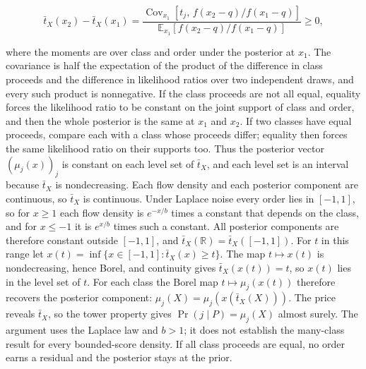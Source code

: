 \documentclass[
  11pt,
]{article}
\begin{document}
\[
\bar t_X(x_2)-\bar t_X(x_1)
=\frac{\operatorname{Cov}_{x_1}\!\left[t_j,\,f(x_2-q)/f(x_1-q)\right]}
{\mathbb E_{x_1}\!\left[f(x_2-q)/f(x_1-q)\right]}\ge0,
\]

where the moments are over class and order under the posterior at
\(x_1\). The covariance is half the expectation of the product of the
difference in class proceeds and the difference in likelihood ratios
over two independent draws, and every such product is nonnegative. If
the class proceeds are not all equal, equality forces the likelihood
ratio to be constant on the joint support of class and order, and then
the whole posterior is the same at \(x_1\) and \(x_2\). If two classes
have equal proceeds, compare each with a class whose proceeds differ;
equality then forces the same likelihood ratio on their supports too.
Thus the posterior vector \((\mu_j(x))_j\) is constant on each level set
of \(\bar t_X\), and each level set is an interval because \(\bar t_X\)
is nondecreasing. Each flow density and each posterior component are
continuous, so \(\bar t_X\) is continuous. Under Laplace noise every
order lies in \([-1,1]\), so for \(x\ge1\) each flow density is
\(e^{-x/b}\) times a constant that depends on the class, and for
\(x\le-1\) it is \(e^{x/b}\) times such a constant. All posterior
components are therefore constant outside \([-1,1]\), and
\(\bar t_X(\mathbb R)=\bar t_X([-1,1])\). For \(t\) in this range let
\(x(t)=\inf\{x\in[-1,1]:\bar t_X(x)\ge t\}\). The map \(t\mapsto x(t)\)
is nondecreasing, hence Borel, and continuity gives
\(\bar t_X(x(t))=t\), so \(x(t)\) lies in the level set of \(t\). For
each class the Borel map \(t\mapsto\mu_j(x(t))\) therefore recovers the
posterior component: \(\mu_j(X)=\mu_j(x(\bar t_X(X)))\). The price
reveals \(\bar t_X\), so the tower property gives
\(\Pr(j\mid P)=\mu_j(X)\) almost surely. The argument uses the Laplace
law and \(b>1\); it does not establish the many-class result for every
bounded-score density. If all
class proceeds are equal, no order earns a residual and the posterior
stays at the prior.
\end{document}
